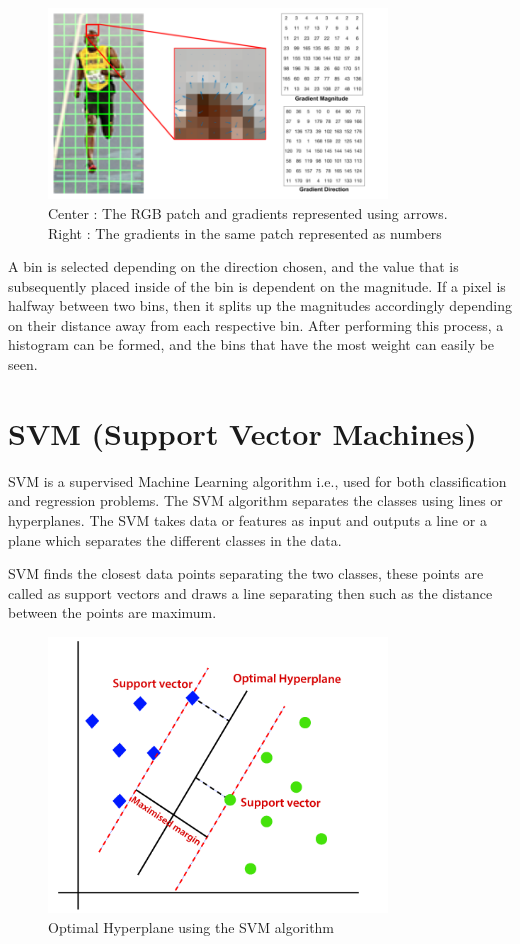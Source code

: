 \documentclass{article}
\begin{document}
\begin{figure}
    \centering
    \includegraphics[width=9cm]{Images/1_HhsKGuHj2zhr2ny9MyvryA.png}
    \caption{Center : The RGB patch and gradients represented using arrows. Right : The gradients in the same patch represented as numbers\cite{mallick-2021}}
\end{figure}

A bin is selected depending on the direction chosen, and the value that is subsequently placed inside of the bin is dependent on the magnitude. If a pixel is halfway between two bins, then it splits up the magnitudes accordingly depending on their distance away from each respective bin. After performing this process, a histogram can be formed, and the bins that have the most weight can easily be seen.


\section{SVM (Support Vector Machines)}


SVM is a supervised Machine Learning algorithm i.e., used for both classification and regression problems. The SVM algorithm separates the classes using lines or hyperplanes. The SVM takes data or features as input and outputs a line or a plane which separates the different classes in the data.

SVM finds the closest data points separating the two classes, these points are called as support vectors and draws a line separating then such as the distance between the points are maximum.

\begin{figure}
    \centering
    \includegraphics[width=9cm]{Images/Picture2.png}
    \caption{Optimal Hyperplane using the SVM algorithm\cite{pupale-2022}}
    \label{fig:galaxy}
\end{figure}
\end{document}
